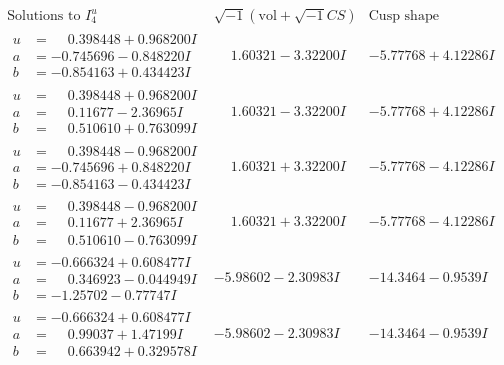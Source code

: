 \documentclass[1p]{elsarticle_modified}
\theoremstyle{definition}
\newcommand{\I}{\sqrt{-1}}
\begin{document}
$$\begin{array}{c|c|c}  
\text{Solutions to }I^u_{4}& \I (\text{vol} + \sqrt{-1}CS) & \text{Cusp shape}\\
 \hline 
\begin{aligned}
u &= \phantom{-}0.398448 + 0.968200 I \\
a &= -0.745696 - 0.848220 I \\
b &= -0.854163 + 0.434423 I\end{aligned}
 & \phantom{-}1.60321 - 3.32200 I & -5.77768 + 4.12286 I \\ \hline\begin{aligned}
u &= \phantom{-}0.398448 + 0.968200 I \\
a &= \phantom{-}0.11677 - 2.36965 I \\
b &= \phantom{-}0.510610 + 0.763099 I\end{aligned}
 & \phantom{-}1.60321 - 3.32200 I & -5.77768 + 4.12286 I \\ \hline\begin{aligned}
u &= \phantom{-}0.398448 - 0.968200 I \\
a &= -0.745696 + 0.848220 I \\
b &= -0.854163 - 0.434423 I\end{aligned}
 & \phantom{-}1.60321 + 3.32200 I & -5.77768 - 4.12286 I \\ \hline\begin{aligned}
u &= \phantom{-}0.398448 - 0.968200 I \\
a &= \phantom{-}0.11677 + 2.36965 I \\
b &= \phantom{-}0.510610 - 0.763099 I\end{aligned}
 & \phantom{-}1.60321 + 3.32200 I & -5.77768 - 4.12286 I \\ \hline\begin{aligned}
u &= -0.666324 + 0.608477 I \\
a &= \phantom{-}0.346923 - 0.044949 I \\
b &= -1.25702 - 0.77747 I\end{aligned}
 & -5.98602 - 2.30983 I & -14.3464 - 0.9539 I \\ \hline\begin{aligned}
u &= -0.666324 + 0.608477 I \\
a &= \phantom{-}0.99037 + 1.47199 I \\
b &= \phantom{-}0.663942 + 0.329578 I\end{aligned}
 & -5.98602 - 2.30983 I & -14.3464 - 0.9539 I \\ \hline\begin{aligned}

\end{aligned}
\end{array}$$
\end{document}
